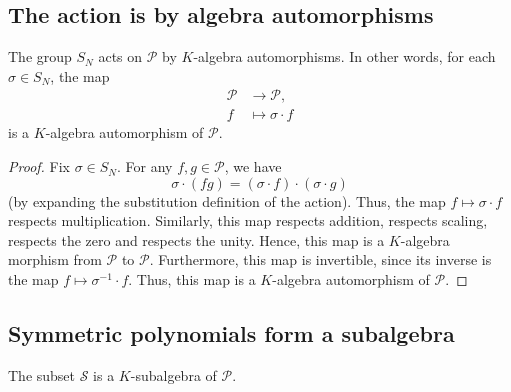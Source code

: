\subsection{The action is by algebra automorphisms}

\begin{proposition}
\label{prop.sf.SN-acts-by-alg-auts}
\leantarget
\leanok
The group $S_N$ acts on $\mathcal{P}$ by
$K$-algebra automorphisms. In other words, for each $\sigma \in S_N$, the map
\begin{align*}
\mathcal{P} &\to \mathcal{P}, \\
f &\mapsto \sigma \cdot f
\end{align*}
is a $K$-algebra automorphism of $\mathcal{P}$.
\end{proposition}

\begin{proof}
Fix $\sigma \in S_N$. For any $f, g \in \mathcal{P}$, we have
\begin{equation}
\sigma \cdot (fg) = (\sigma \cdot f) \cdot (\sigma \cdot g)
\label{pf.prop.sf.SN-acts-by-alg-auts.1}
\end{equation}
(by expanding the substitution definition of the action).
Thus, the map $f \mapsto \sigma \cdot f$
respects multiplication. Similarly, this map respects addition, respects
scaling, respects the zero and respects the unity. Hence, this map is a
$K$-algebra morphism from $\mathcal{P}$ to $\mathcal{P}$. Furthermore, this
map is invertible, since its inverse is the map $f \mapsto \sigma^{-1} \cdot f$.
Thus, this map is a $K$-algebra automorphism of $\mathcal{P}$.
\end{proof}

\subsection{Symmetric polynomials form a subalgebra}

\begin{theorem}
\label{thm.sf.S-subalg}
\leantarget
\leanok
The subset $\mathcal{S}$ is a $K$-subalgebra of $\mathcal{P}$.
\end{theorem}

